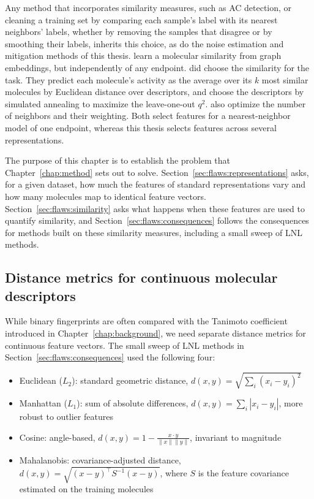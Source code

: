 Any method that incorporates similarity measures, such as AC detection, or cleaning a training set by comparing each sample's label with its nearest neighbors' labels, whether by removing the samples that disagree \citep{Wilson1972} or by smoothing their labels, inherits this choice, as do the noise estimation and mitigation methods of this thesis. \citet{Coupry2022} learn a molecular similarity from graph embeddings, but independently of any endpoint. \citet{Zheng2000} did choose the similarity for the task. They predict each molecule's activity as the average over its $k$ most similar molecules by Euclidean distance over descriptors, and choose the descriptors by simulated annealing to maximize the leave-one-out $q^2$. \citet{Itskowitz2005} also optimize the number of neighbors and their weighting. Both select features for a nearest-neighbor model of one endpoint, whereas this thesis selects features across several representations.

The purpose of this chapter is to establish the problem that Chapter~\ref{chap:method} sets out to solve. Section~\ref{sec:flaws:representations} asks, for a given dataset, how much the features of standard representations vary and how many molecules map to identical feature vectors. Section~\ref{sec:flaws:similarity} asks what happens when these features are used to quantify similarity, and Section~\ref{sec:flaws:consequences} follows the consequences for methods built on these similarity measures, including a small sweep of LNL methods.

\subsection{Distance metrics for continuous molecular descriptors}\label{sec:flaws:methods}

While binary fingerprints are often compared with the Tanimoto coefficient introduced in Chapter~\ref{chap:background}, we need separate distance metrics for continuous feature vectors. The small sweep of LNL methods in Section~\ref{sec:flaws:consequences} used the following four:

\begin{itemize}
    \item Euclidean ($L_2$): standard geometric distance, $d(x, y) = \sqrt{\sum_i (x_i - y_i)^2}$
    \item Manhattan ($L_1$): sum of absolute differences, $d(x, y) = \sum_i |x_i - y_i|$, more robust to outlier features
    \item Cosine: angle-based, $d(x, y) = 1 - \frac{x \cdot y}{\|x\| \|y\|}$, invariant to magnitude
    \item Mahalanobis: covariance-adjusted distance, $d(x,y)=\sqrt{(x-y)^\top S^{-1}(x-y)}$, where $S$ is the feature covariance estimated on the training molecules \citep{Mahalanobis1936}
\end{itemize}


